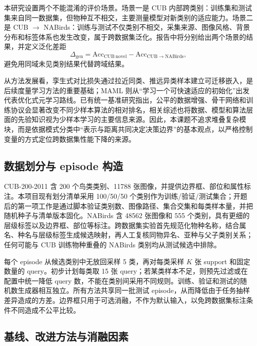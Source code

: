 \documentclass[UTF8,zihao=-4,scheme=chinese]{ctexart}
\begin{document}
本研究设置两个不能混淆的评价场景。场景一是 CUB 内部跨类别：训练集和测试集来自同一数据集，但物种互不相交，主要测量模型对新类别的适应能力。场景二是 CUB $\rightarrow$ NABirds：训练与测试不仅类别不相交，采集来源、图像风格、背景分布和标签体系也发生改变，属于跨数据集泛化。报告中将分别给出两个场景的结果，并定义泛化差距
\begin{equation}
  \Delta_{\mathrm{gen}}=\mathrm{Acc}_{\mathrm{CUB\ novel}}-
  \mathrm{Acc}_{\mathrm{CUB\rightarrow NABirds}},
\end{equation}
避免用同域未见类别结果代替跨域结果。

从方法发展看，孪生式对比损失通过拉近同类、推远异类样本建立可迁移嵌入，是后续度量学习方法的重要基础\cite{hadsell2006dimensionality}；MAML 则从“学习一个可快速适应的初始化”出发代表优化式元学习路线\cite{finn2017maml}。已有统一基准研究指出，公平的数据增强、骨干网络和训练协议会显著改变不同少样本算法的相对排名\cite{chen2019closer}，相关综述也将数据、模型和算法层面的先验知识视为少样本学习的主要信息来源\cite{wang2020generalizing}。因此，本课题不追求堆叠复杂模块，而是依据模式分类中“表示与距离共同决定决策边界”的基本观点\cite{mah2000pattern}，以严格控制变量的方式定位跨数据集性能下降的来源。

\subsection{数据划分与 episode 构造}

CUB-200-2011 含 200 个鸟类类别、11788 张图像，并提供边界框、部位和属性标注\cite{wah2011cub}。本项目现有划分清单采用 100/50/50 个类别作为训练/验证/测试集合；开题后的第一项工作是通过脚本验证类别数、图像路径、集合交集和每类样本量，并把随机种子与清单版本固化。NABirds 含 48562 张图像和 555 个类别，具有更细的层级标签以及边界框、部位等标注\cite{vanhorn2015nabirds}。跨数据集实验首先规范化物种名称，结合属名、种名与层级标签生成候选映射，再人工复核同物异名、亚种与父子类别关系；任何可能与 CUB 训练物种重叠的 NABirds 类别均从测试候选中排除。

每个 episode 从候选类别中无放回采样 5 类，再对每类采样 $K$ 张 support 和固定数量的 query。初步计划每类取 15 张 query；若某类样本不足，则预先过滤或在配置中统一降低 query 数，不能在类别间采用不同规则。训练、验证和测试的随机数生成器相互独立。所有方法共享同一批测试 episode，从而降低由于任务抽样差异造成的方差。边界框只用于可选消融，不作为默认输入，以免跨数据集标注条件不同造成不公平比较。

\subsection{基线、改进方法与消融因素}
\end{document}
